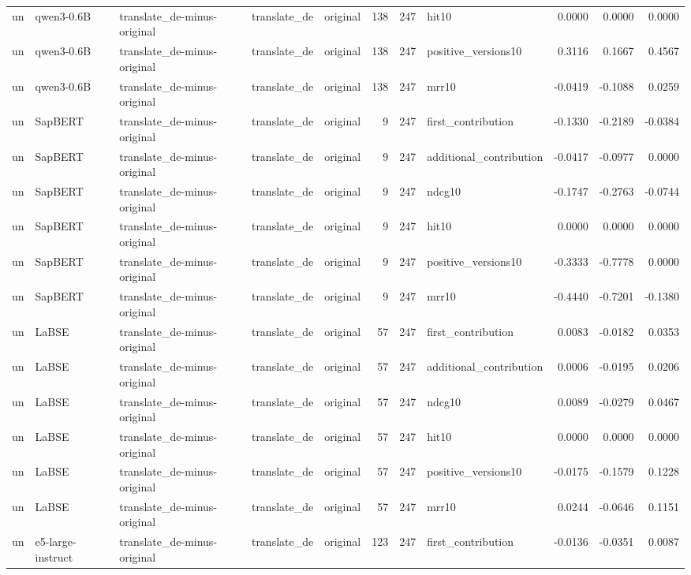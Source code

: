 \begin{tabular}{lllllrrlrrr}
un & qwen3-0.6B & translate\_de-minus-original & translate\_de & original & 138 & 247 & hit10 & 0.0000 & 0.0000 & 0.0000 \\
un & qwen3-0.6B & translate\_de-minus-original & translate\_de & original & 138 & 247 & positive\_versions10 & 0.3116 & 0.1667 & 0.4567 \\
un & qwen3-0.6B & translate\_de-minus-original & translate\_de & original & 138 & 247 & mrr10 & -0.0419 & -0.1088 & 0.0259 \\
un & SapBERT & translate\_de-minus-original & translate\_de & original & 9 & 247 & first\_contribution & -0.1330 & -0.2189 & -0.0384 \\
un & SapBERT & translate\_de-minus-original & translate\_de & original & 9 & 247 & additional\_contribution & -0.0417 & -0.0977 & 0.0000 \\
un & SapBERT & translate\_de-minus-original & translate\_de & original & 9 & 247 & ndcg10 & -0.1747 & -0.2763 & -0.0744 \\
un & SapBERT & translate\_de-minus-original & translate\_de & original & 9 & 247 & hit10 & 0.0000 & 0.0000 & 0.0000 \\
un & SapBERT & translate\_de-minus-original & translate\_de & original & 9 & 247 & positive\_versions10 & -0.3333 & -0.7778 & 0.0000 \\
un & SapBERT & translate\_de-minus-original & translate\_de & original & 9 & 247 & mrr10 & -0.4440 & -0.7201 & -0.1380 \\
un & LaBSE & translate\_de-minus-original & translate\_de & original & 57 & 247 & first\_contribution & 0.0083 & -0.0182 & 0.0353 \\
un & LaBSE & translate\_de-minus-original & translate\_de & original & 57 & 247 & additional\_contribution & 0.0006 & -0.0195 & 0.0206 \\
un & LaBSE & translate\_de-minus-original & translate\_de & original & 57 & 247 & ndcg10 & 0.0089 & -0.0279 & 0.0467 \\
un & LaBSE & translate\_de-minus-original & translate\_de & original & 57 & 247 & hit10 & 0.0000 & 0.0000 & 0.0000 \\
un & LaBSE & translate\_de-minus-original & translate\_de & original & 57 & 247 & positive\_versions10 & -0.0175 & -0.1579 & 0.1228 \\
un & LaBSE & translate\_de-minus-original & translate\_de & original & 57 & 247 & mrr10 & 0.0244 & -0.0646 & 0.1151 \\
un & e5-large-instruct & translate\_de-minus-original & translate\_de & original & 123 & 247 & first\_contribution & -0.0136 & -0.0351 & 0.0087 \\

\end{tabular}
